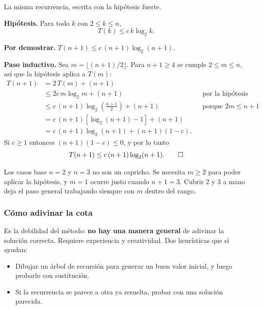 \documentclass[11pt,letterpaper]{article}
\begin{document}
\begin{ejemplo}
  La misma recurrencia, escrita con la hipótesis fuerte.

  \textbf{Hipótesis.} Para todo $k$ con $2 \leq k \leq n$,
  \[
      T(k) \leq c\,k \log_2 k .
  \]

  \textbf{Por demostrar.}
  $T(n+1) \leq c\,(n+1) \log_2 (n+1)$.

  \textbf{Paso inductivo.} Sea $m = \lfloor (n+1)/2 \rfloor$. Para
  $n + 1 \geq 4$ se cumple $2 \leq m \leq n$, así que la hipótesis
  aplica a $T(m)$:
  \begin{align*}
    T(n+1) &= 2\,T(m) + (n+1) \\
           &\leq 2c\,m \log_2 m + (n+1)
            && \text{por la hipótesis} \\
           &\leq c\,(n+1) \log_2\!\left(\tfrac{n+1}{2}\right) + (n+1)
            && \text{porque } 2m \leq n+1 \\
           &= c\,(n+1)\left[\log_2(n+1) - 1\right] + (n+1) \\
           &= c\,(n+1)\log_2(n+1) + (n+1)(1 - c) .
  \end{align*}
  Si $c \geq 1$ entonces $(n+1)(1-c) \leq 0$, y por lo tanto
  \[
      T(n+1) \leq c\,(n+1)\log_2(n+1) . \qedhere
  \]
\end{ejemplo}

\begin{idea}
  Los casos base $n = 2$ y $n = 3$ no son un capricho. Se necesita
  $m \geq 2$ para poder aplicar la hipótesis, y $m = 1$ ocurre justo
  cuando $n + 1 = 3$. Cubrir $2$ y $3$ a mano deja el paso general
  trabajando siempre con $m$ dentro del rango.
\end{idea}

\subsubsection*{Cómo adivinar la cota}

Es la debilidad del método: \textbf{no hay una manera general} de
adivinar la solución correcta. Requiere experiencia y creatividad. Dos
heurísticas que sí ayudan:

\begin{itemize}[itemsep=0.2em]
  \item Dibujar un árbol de recursión para generar un buen valor
        inicial, y luego probarlo con sustitución.
  \item Si la recurrencia se parece a otra ya resuelta, probar con una
        solución parecida.
\end{itemize}
\end{document}
